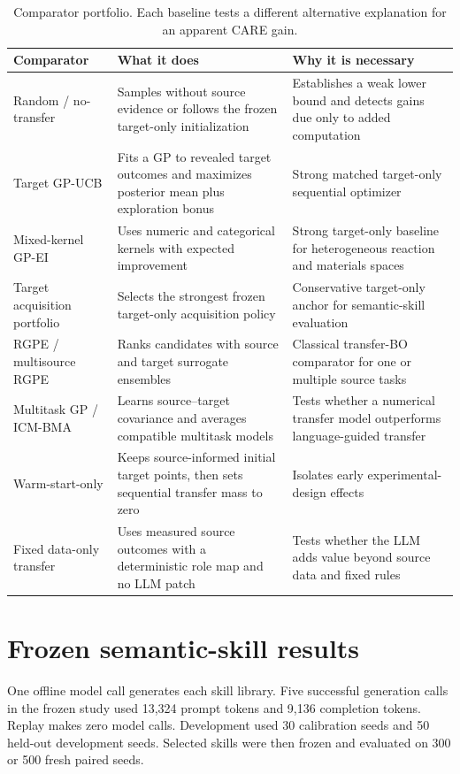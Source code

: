 \documentclass[pdflatex,sn-nature]{sn-jnl}
\begin{document}
\begin{appendices}
\begin{table}[t]
\centering
\caption{Comparator portfolio. Each baseline tests a different alternative
explanation for an apparent CARE gain.}
\label{tab:baselines}
\begin{tabularx}{\textwidth}{p{3.2cm}X X}
\toprule
Comparator & What it does & Why it is necessary \\
\midrule
Random / no-transfer & Samples without source evidence or follows the frozen target-only initialization & Establishes a weak lower bound and detects gains due only to added computation \\
Target GP-UCB & Fits a GP to revealed target outcomes and maximizes posterior mean plus exploration bonus & Strong matched target-only sequential optimizer \\
Mixed-kernel GP-EI & Uses numeric and categorical kernels with expected improvement & Strong target-only baseline for heterogeneous reaction and materials spaces \\
Target acquisition portfolio & Selects the strongest frozen target-only acquisition policy & Conservative target-only anchor for semantic-skill evaluation \\
RGPE / multisource RGPE & Ranks candidates with source and target surrogate ensembles & Classical transfer-BO comparator for one or multiple source tasks \\
Multitask GP / ICM-BMA & Learns source--target covariance and averages compatible multitask models & Tests whether a numerical transfer model outperforms language-guided transfer \\
Warm-start-only & Keeps source-informed initial target points, then sets sequential transfer mass to zero & Isolates early experimental-design effects \\
Fixed data-only transfer & Uses measured source outcomes with a deterministic role map and no LLM patch & Tests whether the LLM adds value beyond source data and fixed rules \\
\bottomrule
\end{tabularx}
\end{table}

\section{Frozen semantic-skill results}
\label{sec:semantic_results}

One offline model call generates each skill library. Five successful generation
calls in the frozen study used 13,324 prompt tokens and 9,136 completion tokens.
Replay makes zero model calls. Development used 30 calibration seeds and 50
held-out development seeds. Selected skills were then frozen and evaluated on
300 or 500 fresh paired seeds.


\end{appendices}
\end{document}
